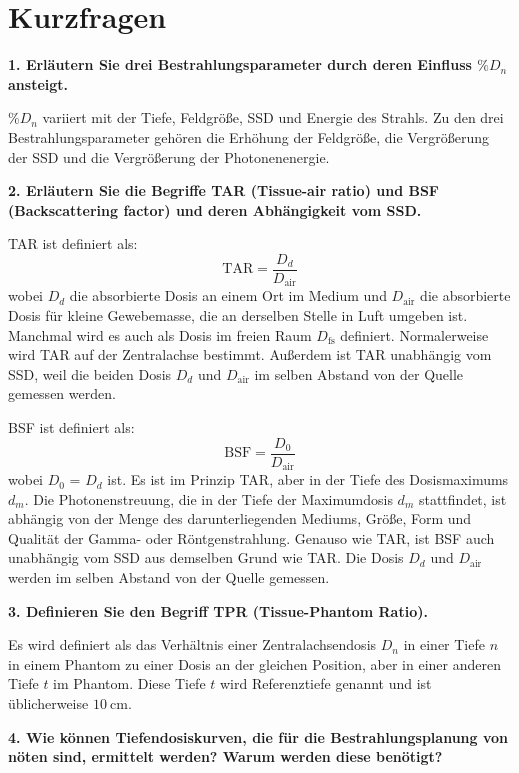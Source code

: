 \section{Kurzfragen}
\label{sec:Theorie}

\textbf{1. Erläutern Sie drei Bestrahlungsparameter durch deren Einfluss $\si{\percent}$$D_n$ ansteigt.}


$\si{\percent}$$D_n$ variiert mit der Tiefe, Feldgröße, SSD und Energie des Strahls.
Zu den drei Bestrahlungsparameter gehören die Erhöhung der Feldgröße, die Vergrößerung der SSD und die Vergrößerung der Photonenenergie.

\textbf{
2. Erläutern Sie die Begriffe TAR (Tissue-air ratio) und BSF (Backscattering factor) und deren Abhängigkeit vom SSD.}

TAR ist definiert als:
\begin{equation*}
\text{TAR} = \frac{D_d}{D_\text{air}}
\end{equation*}
wobei $D_d$ die absorbierte Dosis an einem Ort im Medium und $D_\text{air}$ die absorbierte Dosis für kleine Gewebemasse, die an derselben Stelle in Luft umgeben ist. Manchmal wird es auch als Dosis im freien Raum $D_\text{fs}$ definiert. Normalerweise wird TAR auf der Zentralachse bestimmt. Außerdem ist TAR unabhängig vom SSD, weil die beiden Dosis $D_d$ und $D_\text{air}$ im selben Abstand von der Quelle gemessen werden.

BSF ist definiert als:
\begin{equation*}
\text{BSF} = \frac{D_0}{D_\text{air}}
\end{equation*}
wobei $D_0$ = $D_d$ ist. Es ist im Prinzip TAR, aber in der Tiefe des Dosismaximums $d_m$. Die Photonenstreuung, die in der Tiefe der Maximumdosis $d_m$ stattfindet, ist abhängig von der Menge des darunterliegenden Mediums, Größe, Form und Qualität der Gamma- oder Röntgenstrahlung. Genauso wie TAR, ist BSF auch unabhängig vom SSD aus demselben Grund wie TAR. Die Dosis $D_d$ und $D_\text{air}$ werden im selben Abstand von der Quelle gemessen.

\textbf{3. Definieren Sie den Begriff TPR (Tissue-Phantom Ratio).}

Es wird definiert als das Verhältnis einer Zentralachsendosis $D_n$ in einer Tiefe $n$ in einem Phantom zu einer Dosis an der gleichen Position, aber in
einer anderen Tiefe $t$ im Phantom. Diese Tiefe $t$ wird Referenztiefe genannt und ist üblicherweise $\SI{10}{\centi\meter}$.

\textbf{4. Wie können Tiefendosiskurven, die für die Bestrahlungsplanung von nöten sind, ermittelt werden? Warum werden diese benötigt?}

